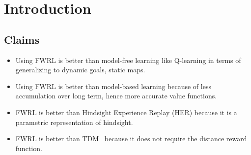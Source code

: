 \documentclass[letterpaper]{article} %
\newcommand{\TODO}[1]{}
\begin{document}
\begin{abstract}
\end{abstract}


\section{ Introduction}




\subsection{Claims}
\begin{itemize} \item
Using FWRL is better than model-free learning like Q-learning in terms of generalizing to dynamic goals, static maps.
\item 
Using FWRL is better than model-based learning because of less accumulation over long term, hence more accurate value functions.
\item FWRL is better than Hindsight Experience Replay (HER) \cite{andrychowicz2016learning} because it is a parametric representation of hindsight.
\item FWRL is better than TDM~\cite{pong2018temporal} because it does not require the distance reward function.
\end{itemize}
\end{document}

